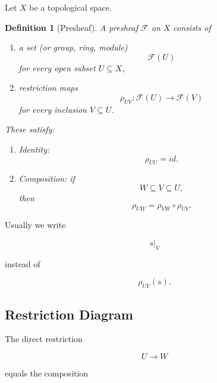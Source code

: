 \documentclass[12pt,a4paper]{article}
\theoremstyle{notespace}
\newtheorem{definition}{Definition}[subsection]
\begin{document}
Let \(X\) be a topological space.

\begin{definition}[Presheaf]
	A \emph{presheaf} \(\mathcal F\) on \(X\) consists of
	
	\begin{enumerate}
		\item a set (or group, ring, module)
		\[
		\mathcal F(U)
		\]
		for every open subset \(U\subseteq X\),
		
		\item restriction maps
		\[
		\rho_{UV}:\mathcal F(U)\to\mathcal F(V)
		\]
		for every inclusion \(V\subseteq U\).
	\end{enumerate}
	
	These satisfy:
	
	\begin{enumerate}
		\item Identity:
		\[
		\rho_{UU}=id.
		\]
		
		\item Composition:
		if
		\[
		W\subseteq V\subseteq U,
		\]
		then
		\[
		\rho_{UW}
		=
		\rho_{VW}\circ \rho_{UV}.
		\]
	\end{enumerate}
\end{definition}

Usually we write

\[
s|_V
\]

instead of

\[
\rho_{UV}(s).
\]

\subsection{Restriction Diagram}

\begin{center}
\end{center}

The direct restriction

\[
U\to W
\]

equals the composition
\end{document}
